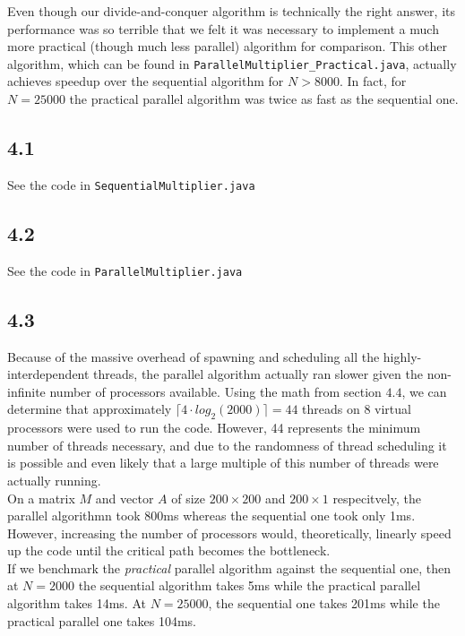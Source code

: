 \documentclass[11pt, letterpaper]{article}
\begin{document}
Even though our divide-and-conquer algorithm is technically the right answer, its performance was so terrible that we felt it was necessary to implement a much more practical (though much less parallel) algorithm for comparison. This other algorithm, which can be found in \texttt{ParallelMultiplier_Practical.java}, actually achieves speedup over the sequential algorithm for $N > 8000$. In fact, for $N = 25000$ the practical parallel algorithm was twice as fast as the sequential one.

\subsection*{4.1}
\label{sub:4_1}

See the code in \texttt{SequentialMultiplier.java}

\subsection*{4.2}
\label{sub:4_2}

See the code in \texttt{ParallelMultiplier.java}

\newpage
\subsection*{4.3}
Because of the massive overhead of spawning and scheduling all the highly-interdependent threads, the parallel algorithm actually ran slower given the non-infinite number of processors available. Using the math from section $4.4$, we can determine that approximately $\lceil4 \cdot log_2(2000)\rceil = 44$ threads on 8 virtual processors were used to run the code. However, 44 represents the minimum number of threads necessary, and due to the randomness of thread scheduling it is possible and even likely that a large multiple of this number of threads were actually running.\\

On a matrix $M$ and vector $A$ of size $200 \times 200$ and $200 \times 1$ respecitvely, the parallel algorithmn took 800ms whereas the sequential one took only 1ms.\\

However, increasing the number of processors would, theoretically, linearly speed up the code until the critical path becomes the bottleneck.\\

If we benchmark the \textit{practical} parallel algorithm against the sequential one, then at $N = 2000$ the sequential algorithm takes 5ms while the practical parallel algorithm takes 14ms. At $N = 25000$, the sequential one takes 201ms while the practical parallel one takes 104ms.
\end{document}
